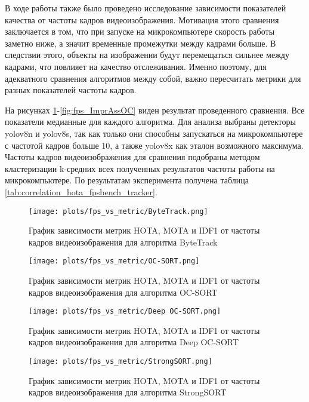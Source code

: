 В ходе работы также было проведено исследование зависимости показателей качества от частоты кадров видеоизображения. 
Мотивация этого сравнения заключается в том, что при запуске на микрокомпьютере скорость работы заметно ниже, а значит временные промежутки между кадрами больше. 
В следствии этого, объекты на изображении будут перемещаться сильнее между кадрами, что повлияет на качество отслеживания. 
Именно поэтому, для адекватного сравнения алгоритмов между собой, важно пересчитать метрики для разных показателей частоты кадров. 

На рисунках \ref{fig:fps_ByteTrack}-\ref{fig:fps_ImprAssOC} виден результат проведенного сравнения. 
Все показатели медианные для каждого алгоритма. 
Для анализа выбраны детекторы yolov8n и yolov8s, так как только они способны запускаться на микрокомпьютере с частотой кадров больше 10, а также yolov8x как эталон возможного максимума.
Частоты кадров видеоизображения для сравнения подобраны методом кластеризации k-средних всех полученных результатов частоты работы на микрокомпьютере.
По результатам эксперимента получена таблица \ref{tab:correlation_hota_fpsbench_tracker}. 


\begin{figure}[ht]
    \centering
    \texttt{[image: plots/fps\_vs\_metric/ByteTrack.png]}
    \caption{График зависимости метрик HOTA, MOTA и IDF1 от частоты кадров видеоизображения для алгоритма ByteTrack}
    \label{fig:fps_ByteTrack}
\end{figure}

\begin{figure}[ht]
    \centering
    \texttt{[image: plots/fps\_vs\_metric/OC-SORT.png]}
    \caption{График зависимости метрик HOTA, MOTA и IDF1 от частоты кадров видеоизображения для алгоритма OC-SORT}
    \label{fig:fps_OC-SORT}
\end{figure}

\begin{figure}[ht]
    \centering
    \texttt{[image: plots/fps\_vs\_metric/Deep OC-SORT.png]}
    \caption{График зависимости метрик HOTA, MOTA и IDF1 от частоты кадров видеоизображения для алгоритма Deep OC-SORT}
    \label{fig:fps_Deep OC-SORT}
\end{figure}

\begin{figure}[ht]
    \centering
    \texttt{[image: plots/fps\_vs\_metric/StrongSORT.png]}
    \caption{График зависимости метрик HOTA, MOTA и IDF1 от частоты кадров видеоизображения для алгоритма StrongSORT}
    \label{fig:fps_StrongSORT}
\end{figure}

